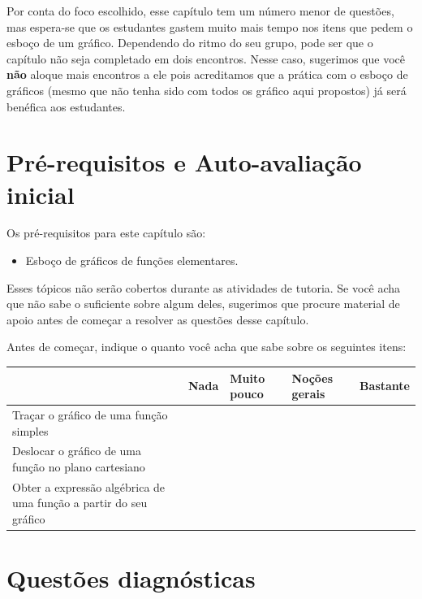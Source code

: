 \documentclass[main.tex]{subfiles}
\begin{document}
Por conta do foco escolhido, esse capítulo tem um número menor de questões, mas espera-se que os estudantes gastem muito mais tempo nos itens que pedem o esboço de um gráfico. Dependendo do ritmo do seu grupo, pode ser que o capítulo não seja completado em dois encontros. Nesse caso, sugerimos que você \textbf{não} aloque mais encontros a ele pois acreditamos que a prática com o esboço de gráficos (mesmo que não tenha sido com todos os gráfico aqui propostos) já será benéfica aos estudantes.

\paraAmbos

\section{Pré-requisitos e Auto-avaliação inicial}

Os pré-requisitos para este capítulo são:
\begin{itemize}
 \item Esboço de gráficos de funções elementares.
\end{itemize}

Esses tópicos não serão cobertos durante as atividades de tutoria. Se você acha que não sabe o suficiente sobre algum deles, sugerimos que procure material de apoio antes de começar a resolver as questões desse capítulo.

\paraFolhaAvaliacoes

Antes de começar, indique o quanto você acha que sabe sobre os seguintes itens:

\begin{center}
 \begin{tabular}{|p{35mm}||p{15mm}|p{15mm}|p{15mm}|p{15mm}|} 
 \hline
   & Nada & Muito pouco & Noções gerais & Bastante\\
 \hline
 Traçar o gráfico de uma função simples &  &  &  &  \\ 
 \hline
 Deslocar o gráfico de uma função no plano cartesiano &  &  &  &  \\
 \hline
 Obter a expressão algébrica de uma função a partir do seu gráfico &  &  &  &  \\
 \hline
\end{tabular}
\end{center}

\paraAmbos

\section{Questões diagnósticas}
\end{document}
